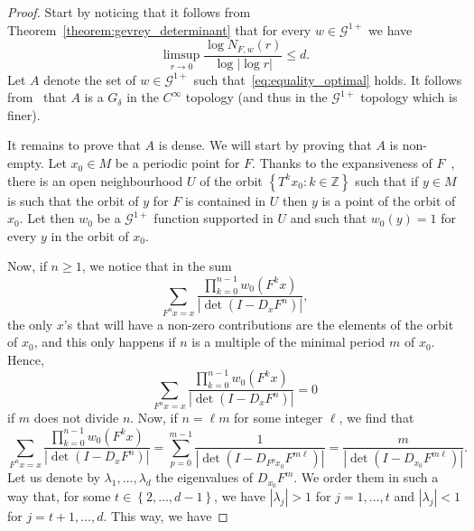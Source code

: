\documentclass[AHL,Unicode,longabstracts,published]{cedram}
\newcommand{\set}[1]{\left\{ #1 \right\}}
\newcommand{\p}[1]{\left(#1\right)}
\newcommand{\va}[1]{\left|#1\right|}
\newcommand{\clG}{\mathcal{G}}
\newcommand{\bbZ}{\mathbb{Z}}
\begin{document}
\begin{proof}
Start by noticing that it follows from Theorem~\ref{theorem:gevrey_determinant} that for every $w \in \clG^{1+}$ we have
\begin{equation*}
\limsup_{r \to 0} \frac{\log N_{F,w}(r)}{\log \va{\log r}} \leq d.
\end{equation*}
Let $A$ denote the set of $w \in \clG^{1+}$ such that~\eqref{eq:equality_optimal} holds. It follows from~\cite[Theorem~2.7]{gouezel_liverani_1} that $A$ is a $G_\delta$ in the $C^\infty$ topology (and thus in the $\clG^{1+}$ topology which is finer).

It remains to prove that $A$ is dense. We will start by proving that $A$ is non-empty. Let $x_0 \in M$ be a periodic point for $F$. Thanks to the expansiveness of $F$~\cite[Corollary~6.4.10]{katok_hasselblatt}, there is an open neighbourhood $U$ of the orbit $\set{T^k x_0: k \in \bbZ}$ such that if $y \in M$ is such that the orbit of $y$ for $F$ is contained in $U$ then $y$ is a point of the orbit of $x_0$. Let then $w_0$ be a $\clG^{1+}$ function supported in $U$ and such that $w_0(y) = 1$ for every $y$ in the orbit of $x_0$.

Now, if $n \geq 1$, we notice that in the sum
\begin{equation*}
\sum_{F^n x = x} \frac{\prod_{k = 0}^{n-1} w_0\left(F^k x\right)}{\va{\det\p{ I - D_x F^n}}},
\end{equation*}
the only $x$'s that will have a non-zero contributions are the elements of the orbit of $x_0$, and this only happens if $n$ is a multiple of the minimal period $m$ of $x_0$. Hence,
\begin{equation*}
\sum_{F^n x = x} \frac{\prod_{k = 0}^{n-1} w_0\left(F^k x\right)}{\va{\det\p{ I - D_x F^n}}} = 0
\end{equation*}
if $m$ does not divide $n$. Now, if $n = \ell m$ for some integer $\ell$, we find that
\begin{equation*}
\sum_{F^n x = x} \frac{\prod_{k = 0}^{n-1} w_0\left(F^k x\right)}{\va{\det\p{ I - D_x F^n}}} = \sum_{p = 0}^{m-1} \frac{1}{\va{\det\p{I - D_{F^p x_0} F^{m \ell}}}} = \frac{m}{\va{\det\p{I - D_{x_0} F^{m \ell}}}}.
\end{equation*}
Let us denote by $\lambda_1, \dots, \lambda_d$ the eigenvalues of $D_{x_0} F^m$. We order them in such a way that, for some $t \in \set{2, \dots, d-1}$, we have $\va{\lambda_j} > 1$ for $j = 1, \dots, t$ and $\va{\lambda_j} < 1$ for $j = t+1, \dots, d$. This way, we have


\end{proof}
\end{document}
